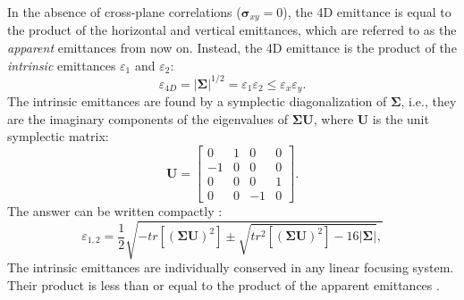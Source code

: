 In the absence of cross-plane correlations ($\bm{\sigma}_{xy} = 0$), the 4D emittance is equal to the product of the horizontal and vertical emittances, which are referred to as the \textit{apparent} emittances from now on. Instead, the 4D emittance is the product of the \textit{intrinsic} emittances $\varepsilon_1$ and $\varepsilon_2$:
%
\begin{equation} \label{eq:mode_emittances1}
    \varepsilon_{4D} = \left|{\bm{\Sigma}}\right|^{1/2} = \varepsilon_1\varepsilon_2 \le \varepsilon_x\varepsilon_y.
\end{equation}
%
The intrinsic emittances are found by a symplectic diagonalization of $\bm{\Sigma}$, i.e., they are the imaginary components of the eigenvalues of $\bm{\Sigma}\mathbf{U}$, where $\mathbf{U}$ is the unit symplectic matrix:
%
\begin{equation}
    \mathbf{U} = 
    \begin{bmatrix}
        0 & 1 & 0 & 0 \\
        -1 & 0 & 0 & 0 \\
        0 & 0 & 0 & 1 \\
        0 & 0 & -1 & 0
    \end{bmatrix}.
\end{equation}
%
The answer can be written compactly \cite{Xiao2013}:
%
\begin{equation}
    \varepsilon_{1, 2} = \frac{1}{2}\sqrt{
      -tr\left[(\bm{\Sigma} \mathbf{U})^2\right] \pm \sqrt{tr^2\left[(\bm{\Sigma} \mathbf{U})^2\right] - 16|{\bm{\Sigma}}|},
    }
\end{equation}
%
The intrinsic emittances are individually conserved in any linear focusing system. Their product is less than or equal to the product of the apparent emittances \cite{Buon1993}.

